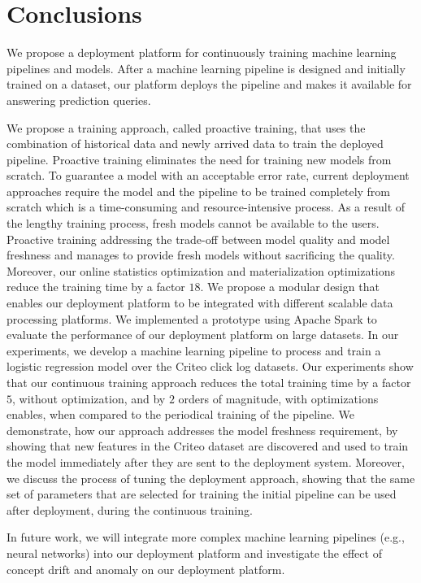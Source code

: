 \section{Conclusions} \label{conclusion}
We propose a deployment platform for continuously training machine learning pipelines and models.
After a machine learning pipeline is designed and initially trained on a dataset, our platform deploys the pipeline and makes it available for answering prediction queries.

We propose a training approach, called proactive training, that uses the combination of historical data and newly arrived data to train the deployed pipeline.
Proactive training eliminates the need for training new models from scratch.
To guarantee a model with an acceptable error rate, current deployment approaches require the model and the pipeline to be trained completely from scratch which is a time-consuming and resource-intensive process.
As a result of the lengthy training process, fresh models cannot be available to the users.
Proactive training addressing the trade-off between model quality and model freshness and manages to provide fresh models without sacrificing the quality. 
Moreover, our online statistics optimization and materialization optimizations reduce the training time by a factor $18$.
We propose a modular design that enables our deployment platform to be integrated with different scalable data processing platforms.
We implemented a prototype using Apache Spark to evaluate the performance of our deployment platform on large datasets.
In our experiments, we develop a machine learning pipeline to process and train a logistic regression model over the Criteo click log datasets.
Our experiments show that our continuous training approach reduces the total training time by a factor $5$, without optimization, and by $2$ orders of magnitude, with optimizations enables, when compared to the periodical training of the pipeline.
We demonstrate, how our approach addresses the model freshness requirement, by showing that new features in the Criteo dataset are discovered and used to train the model immediately after they are sent to the deployment system.
Moreover, we discuss the process of tuning the deployment approach, showing that the same set of parameters that are selected for training the initial pipeline can be used after deployment, during the continuous training.

In future work, we will integrate more complex machine learning pipelines (e.g., neural networks) into our deployment platform and investigate the effect of concept drift and anomaly on our deployment platform.

